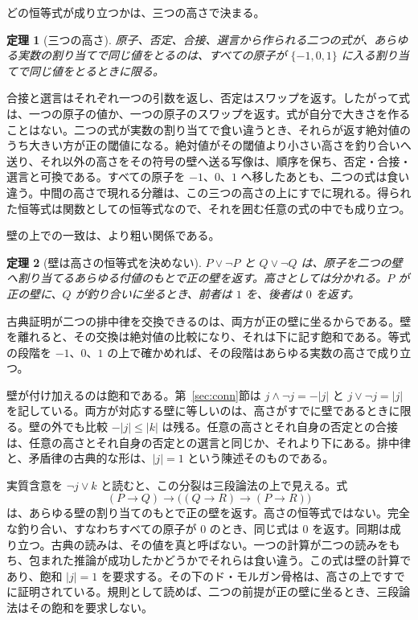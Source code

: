 \documentclass[a4paper]{article}
\newtheorem{theorem}{定理}[section]
\theoremstyle{definition}
\begin{document}
どの恒等式が成り立つかは、三つの高さで決まる。

\begin{theorem}[三つの高さ]
\label{thm:three}
原子、否定、合接、選言から作られる二つの式が、あらゆる実数の割り当てで同じ値をとるのは、すべての原子が \(\{-1,0,1\}\) に入る割り当てで同じ値をとるときに限る。
\end{theorem}

合接と選言はそれぞれ一つの引数を返し、否定はスワップを返す。したがって式は、一つの原子の値か、一つの原子のスワップを返す。式が自分で大きさを作ることはない。二つの式が実数の割り当てで食い違うとき、それらが返す絶対値のうち大きい方が正の閾値になる。絶対値がその閾値より小さい高さを釣り合いへ送り、それ以外の高さをその符号の壁へ送る写像は、順序を保ち、否定・合接・選言と可換である。すべての原子を \(-1\)、\(0\)、\(1\) へ移したあとも、二つの式は食い違う。中間の高さで現れる分離は、この三つの高さの上にすでに現れる。得られた恒等式は関数としての恒等式なので、それを囲む任意の式の中でも成り立つ。

壁の上での一致は、より粗い関係である。

\begin{theorem}[壁は高さの恒等式を決めない]
\label{thm:walls-coarse}
\(P\vee\neg P\) と \(Q\vee\neg Q\) は、原子を二つの壁へ割り当てるあらゆる付値のもとで正の壁を返す。高さとしては分かれる。\(P\) が正の壁に、\(Q\) が釣り合いに坐るとき、前者は \(1\) を、後者は \(0\) を返す。
\end{theorem}

古典証明が二つの排中律を交換できるのは、両方が正の壁に坐るからである。壁を離れると、その交換は絶対値の比較になり、それは下に記す飽和である。等式の段階を \(-1\)、\(0\)、\(1\) の上で確かめれば、その段階はあらゆる実数の高さで成り立つ。

壁が付け加えるのは飽和である。第~\ref{sec:conn}節は \(j\wedge\neg j=-|j|\) と \(j\vee\neg j=|j|\) を記している。両方が対応する壁に等しいのは、高さがすでに壁であるときに限る。壁の外でも比較 \(-|j|\le|k|\) は残る。任意の高さとそれ自身の否定との合接は、任意の高さとそれ自身の否定との選言と同じか、それより下にある。排中律と、矛盾律の古典的な形は、\(|j|=1\) という陳述そのものである。

実質含意を \(\neg j\vee k\) と読むと、この分裂は三段論法の上で見える。式
\[
(P\to Q)\to\bigl((Q\to R)\to(P\to R)\bigr)
\]
は、あらゆる壁の割り当てのもとで正の壁を返す。高さの恒等式ではない。完全な釣り合い、すなわちすべての原子が \(0\) のとき、同じ式は \(0\) を返す。同期は成り立つ。古典の読みは、その値を真と呼ばない。一つの計算が二つの読みをもち、包まれた推論が成功したかどうかでそれらは食い違う。この式は壁の計算であり、飽和 \(|j|=1\) を要求する。その下のド・モルガン骨格は、高さの上ですでに証明されている。規則として読めば、二つの前提が正の壁に坐るとき、三段論法はその飽和を要求しない。
\end{document}

